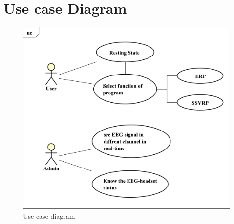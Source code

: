 \section{Use case Diagram}

\begin{figure}[ht]
\centering \includegraphics[scale=0.5]{chapter4/uc.pdf}
\caption{Use case diagram}
\end{figure}


\newpage{}


